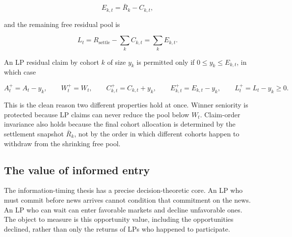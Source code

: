 \documentclass[10pt]{article}
\begin{document}
\[
E_{k,t} = \bar R_k - C_{k,t},
\]

and the remaining free residual pool is

\[
L_t = R_{\mathrm{settle}} - \sum_k C_{k,t} = \sum_k E_{k,t}.
\]

An LP residual claim by cohort $k$ of size $y_k$ is permitted only if $0 \le y_k \le E_{k,t}$, in which case

\[
A_t^{+} = A_t - y_k,
\qquad
W_t^{+} = W_t,
\qquad
C_{k,t}^{+} = C_{k,t} + y_k,
\qquad
E_{k,t}^{+} = E_{k,t} - y_k,
\qquad
L_t^{+} = L_t - y_k \ge 0.
\]

This is the clean reason two different properties hold at once. Winner seniority is protected because LP claims can never reduce the pool below $W_t$. Claim-order invariance also holds because the final cohort allocation is determined by the settlement snapshot $\bar R_k$, not by the order in which different cohorts happen to withdraw from the shrinking free pool.

\begin{center}
\setlength{\fboxsep}{8pt}
\end{center}

\subsection{The value of informed entry}

The information-timing thesis has a precise decision-theoretic core. An LP who must commit before news arrives cannot condition that commitment on the news. An LP who can wait can enter favorable markets and decline unfavorable ones. The object to measure is this opportunity value, including the opportunities declined, rather than only the returns of LPs who happened to participate.
\end{document}
